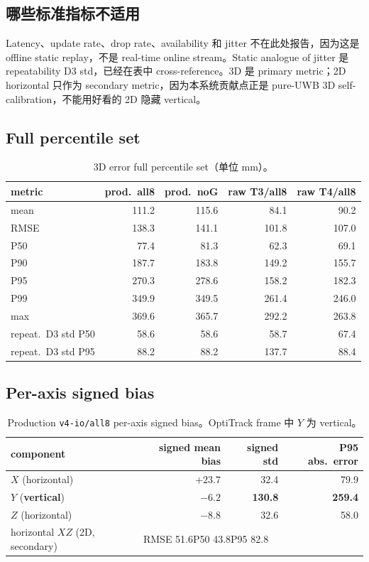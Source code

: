 \documentclass[11pt,a4paper]{article}
\begin{document}
\subsection{哪些标准指标不适用}
Latency、update rate、drop rate、availability 和 jitter 不在此处报告，因为这是 offline
static replay，不是 real-time online stream。Static analogue of jitter 是 repeatability
D3 std，已经在表中 cross-reference。3D 是 primary metric；2D horizontal 只作为 secondary
metric，因为本系统贡献点正是 pure-UWB 3D self-calibration，不能用好看的 2D 隐藏 vertical。

\subsection{Full percentile set}
\begin{table}[h]
\centering
\caption{3D error full percentile set（单位 \si{\milli\meter}）。}
\begin{tabular}{lrrrr}
\toprule
metric & prod.\ all8 & prod.\ noG & raw T3/all8 & raw T4/all8 \\
\midrule
mean        & 111.2 & 115.6 & 84.1  & 90.2  \\
RMSE        & 138.3 & 141.1 & 101.8 & 107.0 \\
P50         & 77.4  & 81.3  & 62.3  & 69.1  \\
P90         & 187.7 & 183.8 & 149.2 & 155.7 \\
P95         & 270.3 & 278.6 & 158.2 & 182.3 \\
P99         & 349.9 & 349.5 & 261.4 & 246.0 \\
max         & 369.6 & 365.7 & 292.2 & 263.8 \\
\midrule
repeat.\ D3 std P50 & 58.6 & 58.6 & 58.7  & 67.4 \\
repeat.\ D3 std P95 & 88.2 & 88.2 & 137.7 & 88.4 \\
\bottomrule
\end{tabular}
\end{table}

\subsection{Per-axis signed bias}
\begin{table}[h]
\centering
\caption{Production \texttt{v4-io/all8} per-axis signed bias。OptiTrack frame 中 $Y$ 为 vertical。}
\begin{tabular}{lrrr}
\toprule
component & signed mean bias & signed std & P95 abs.\ error \\
\midrule
$X$ (horizontal)        & $+23.7$ & 32.4  & 79.9  \\
$Y$ (\textbf{vertical}) & $-6.2$  & \textbf{130.8} & \textbf{259.4} \\
$Z$ (horizontal)        & $-8.8$  & 32.6  & 58.0  \\
\midrule
horizontal $XZ$ (2D, secondary) & \multicolumn{3}{l}{RMSE 51.6\quad P50 43.8\quad P95 82.8} \\
\bottomrule
\end{tabular}
\end{table}
\end{document}
